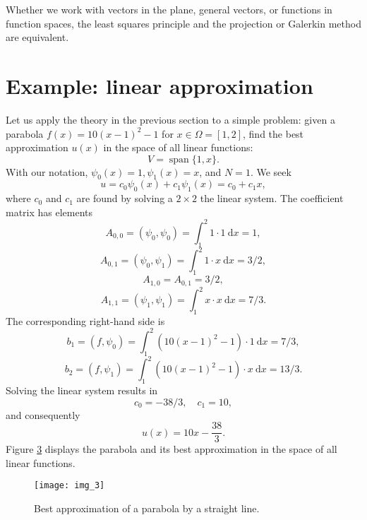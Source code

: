 \documentclass[../main.tex]{subfiles}
\begin{document}
Whether we work with vectors in the plane, general vectors, or functions in function spaces, the least squares principle and the projection or Galerkin method are equivalent.

\section[Example: linear approximation]{Example: linear approximation}
\label{sec:sec_2_3}
\noindent Let us apply the theory in the previous section to a simple problem: given a parabola $f(x)=10(x-1)^{2}-1$ for $x \in \Omega=[1,2]$, find the best approximation $u(x)$ in the space of all linear functions:
$$
V=\operatorname{span}\{1, x\} .
$$
With our notation, $\psi_{0}(x)=1, \psi_{1}(x)=x$, and $N=1$. We seek
$$
u=c_{0} \psi_{0}(x)+c_{1} \psi_{1}(x)=c_{0}+c_{1} x,
$$
where $c_{0}$ and $c_{1}$ are found by solving a $2 \times 2$ the linear system. The coefficient matrix has elements
\begin{equation}\label{eqa31}
	A_{0,0}=\left(\psi_{0}, \psi_{0}\right)=\int_{1}^{2} 1 \cdot 1 \mathrm{~d} x=1,
\end{equation}
\begin{equation}\label{eqa32}
	A_{0,1}=\left(\psi_{0}, \psi_{1}\right)=\int_{1}^{2} 1 \cdot x \mathrm{~d} x=3/2,
\end{equation}
\begin{equation}\label{eqa33}
	A_{1,0}=A_{0,1}=3 / 2,
\end{equation}
\begin{equation}\label{eqa34}
	A_{1,1}=\left(\psi_{1}, \psi_{1}\right)=\int_{1}^{2} x \cdot x \mathrm{~d} x=7 / 3.
\end{equation}
The corresponding right-hand side is
\begin{equation}\label{eqa35}
	b_{1}=\left(f, \psi_{0}\right)=\int_{1}^{2}\left(10(x-1)^{2}-1\right) \cdot 1 \mathrm{~d} x=7 / 3,
\end{equation}
\begin{equation}\label{eqa36}
	b_{2}=\left(f, \psi_{1}\right)=\int_{1}^{2}\left(10(x-1)^{2}-1\right) \cdot x \mathrm{~d} x=13 / 3.
\end{equation}
Solving the linear system results in
\begin{equation}\label{eqa37}
	c_{0}=-38 / 3, \quad c_{1}=10,
\end{equation}
and consequently
\begin{equation}\label{eqa38}
	u(x)=10 x-\frac{38}{3}.
\end{equation}
Figure \hyperref[fig:img_3]{3} displays the parabola and its best approximation in the space of all linear functions.
\begin{figure}[H]
	\centering
	\texttt{[image: img\_3]}
	\caption{Best approximation of a parabola by a straight line.}
	\label{fig:img_3}
\end{figure}
\end{document}
